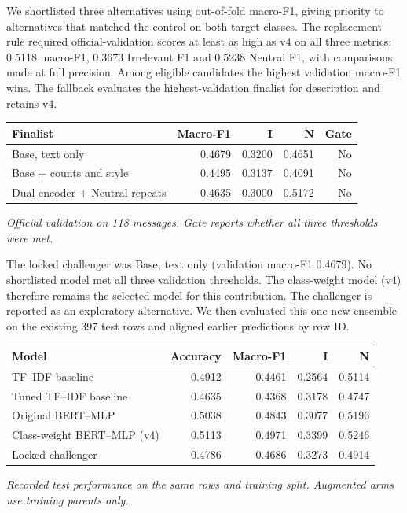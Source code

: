 We shortlisted three alternatives using out-of-fold macro-F1, giving priority to alternatives that matched the control on both target classes. The replacement rule required official-validation scores at least as high as v4 on all three metrics: 0.5118 macro-F1, 0.3673 Irrelevant F1 and 0.5238 Neutral F1, with comparisons made at full precision. Among eligible candidates the highest validation macro-F1 wins. The fallback evaluates the highest-validation finalist for description and retains v4.

\begin{center}\begin{minipage}{\linewidth}\centering\small
\begin{tabular}{lrrrr}
\toprule
Finalist & Macro-F1 & I & N & Gate \\
\midrule
Base, text only & 0.4679 & 0.3200 & 0.4651 & No \\
Base + counts and style & 0.4495 & 0.3137 & 0.4091 & No \\
Dual encoder + Neutral repeats & 0.4635 & 0.3000 & 0.5172 & No \\
\bottomrule
\end{tabular}
\par\smallskip\textit{Official validation on 118 messages. Gate reports whether all three thresholds were met.}
\end{minipage}\end{center}

The locked challenger was Base, text only (validation macro-F1 0.4679). No shortlisted model met all three validation thresholds. The class-weight model (v4) therefore remains the selected model for this contribution. The challenger is reported as an exploratory alternative. We then evaluated this one new ensemble on the existing 397 test rows and aligned earlier predictions by row ID.

\begin{center}\begin{minipage}{\linewidth}\centering\small
\begin{tabular}{lrrrr}
\toprule
Model & Accuracy & Macro-F1 & I & N \\
\midrule
TF--IDF baseline & 0.4912 & 0.4461 & 0.2564 & 0.5114 \\
Tuned TF--IDF baseline & 0.4635 & 0.4368 & 0.3178 & 0.4747 \\
Original BERT--MLP & 0.5038 & 0.4843 & 0.3077 & 0.5196 \\
Class-weight BERT--MLP (v4) & 0.5113 & 0.4971 & 0.3399 & 0.5246 \\
Locked challenger & 0.4786 & 0.4686 & 0.3273 & 0.4914 \\
\bottomrule
\end{tabular}
\par\smallskip\textit{Recorded test performance on the same rows and training split. Augmented arms use training parents only.}
\end{minipage}\end{center}

